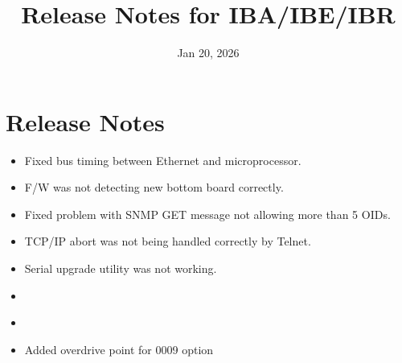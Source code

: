 \documentclass[letterpaper,10pt,english]{sphinxhowto}
\title{Release Notes for IBA/IBE/IBR}
\date{Jan 20, 2026}
\author{}
\begin{document}
\pagestyle{empty}

\pagestyle{plain}

\pagestyle{normal}
\label{\detokenize{index::doc}}


\sphinxstepscope


\section{Release Notes}
\label{\detokenize{topics/release_notes:release-notes}}\label{\detokenize{topics/release_notes::doc}}\begin{description}
\begin{itemize}
\item {} 
\sphinxAtStartPar
Fixed bus timing between Ethernet and microprocessor.

\item {} 
\sphinxAtStartPar
F/W was not detecting new bottom board correctly.

\end{itemize}

\begin{itemize}
\item {} 
\sphinxAtStartPar
Fixed problem with SNMP GET message not allowing more than 5 OIDs.

\end{itemize}

\begin{itemize}
\item {} 
\sphinxAtStartPar
TCP/IP abort was not being handled correctly by Telnet.

\end{itemize}

\begin{itemize}
\item {} 
\sphinxAtStartPar
Serial upgrade utility was not working.

\end{itemize}

\begin{itemize}
\item {} 
\end{itemize}

\begin{itemize}
\item {} 
\end{itemize}

\begin{itemize}
\item {} 
\sphinxAtStartPar
Added overdrive point for \sphinxhyphen{}0009 option


\end{itemize}
\end{description}
\end{document}
